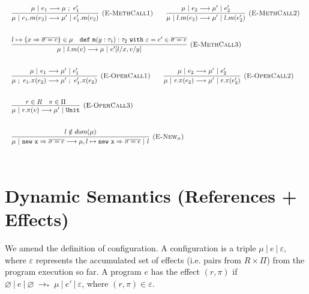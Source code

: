 \documentclass{llncs}
\newcommand{\keywadj}[1]{\mathtt{#1}}
\newcommand{\keyw}[1]{\keywadj{#1}~}
\begin{document}
\[
\begin{array}{lll}
\begin{array}{lllr}
	\infer[\textsc{(E-MethCall1)}]
		{\mu~|~e_1.m(e_2) \longrightarrow \mu'~|~e_1'.m(e_2)}
		{\mu~|~e_1 \longrightarrow \mu~;~e_1'}
		
		~~~~~~
		
	\infer[\textsc{(E-MethCall2)}]
		{\mu~|~l.m(e_2) \longrightarrow \mu'~|~l.m(e_2')}
		{\mu~|~e_2 \longrightarrow \mu'~|~e_2'}\\[5ex]
		
	\infer[\textsc{(E-MethCall3)}]
		{\mu~|~l.m(v)
			\longrightarrow
		 \mu~|~e'[l/x, v/y]}
  		{l \mapsto \{ x \Rightarrow \overline{\sigma = e} \} \in \mu & \keywadj{def~m}(y: \tau_1) : \tau_2~\keyw{with} \varepsilon = e' \in \overline {\sigma = e}} \\[5ex]

			
	\infer[\textsc{(E-OperCall1)}]
		{\mu~;~e_1.\pi(e_2)
			\longrightarrow
		 \mu'~;~e_1'.\pi(e_2)}
		{\mu~|~e_1 \longrightarrow \mu'~|~e_1'}
~~~~~~
			\infer[\textsc{(E-OperCall2)}]
		{\mu~|~r.\pi(e_2)
			\longrightarrow
		 \mu'~|~r.\pi(e_2')}
		{\mu~|~e_2 \longrightarrow \mu'~|~e_2'} \\[5ex]
			
			\infer[\textsc{(E-OperCall3)}]
		{\mu~|~r.\pi(v)
			\longrightarrow
		 \mu'~|~\keywadj{Unit}}
		{r \in R & \pi \in \Pi} \\[5ex]
			
	\infer[\textsc{(E-New$_\sigma$)}]
		{\mu~|~\keywadj{new~x} \Rightarrow \overline{\sigma = e}
			\longrightarrow
		 \mu, l \mapsto \keywadj{new~x} \Rightarrow \overline{\sigma = e}~|~l }
		{l \notin dom(\mu)} \\[5ex]
		
\end{array}
\end{array}
\]

\section{Dynamic Semantics (References + Effects)}

We amend the definition of configuration. A configuration is a triple $\mu~|~e~|~\varepsilon$, where $\varepsilon$ represents the accumulated set of effects (i.e. pairs from $R \times \Pi$) from the program execution so far. A program $e$ has the effect $(r, \pi)$ if $\varnothing~|~e~|~\varnothing~\longrightarrow_*~\mu~|~e'~|~\varepsilon$, where $(r, \pi) \in \varepsilon$. 
\\
\end{document}
